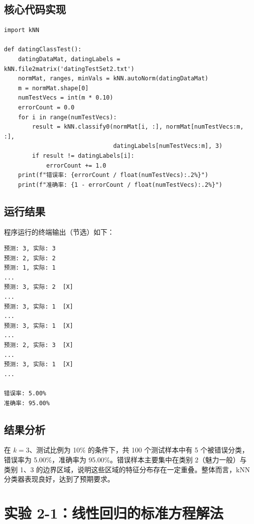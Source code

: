 \documentclass[10.5pt]{config}
\begin{document}
\subsection{核心代码实现}
\begin{listing}[H]
\begin{verbatim}
import kNN

def datingClassTest():
    datingDataMat, datingLabels = kNN.file2matrix('datingTestSet2.txt')
    normMat, ranges, minVals = kNN.autoNorm(datingDataMat)
    m = normMat.shape[0]
    numTestVecs = int(m * 0.10)
    errorCount = 0.0
    for i in range(numTestVecs):
        result = kNN.classify0(normMat[i, :], normMat[numTestVecs:m, :],
                               datingLabels[numTestVecs:m], 3)
        if result != datingLabels[i]:
            errorCount += 1.0
    print(f"错误率: {errorCount / float(numTestVecs):.2%}")
    print(f"准确率: {1 - errorCount / float(numTestVecs):.2%}")
\end{verbatim}
\caption{算法测试逻辑 (exp1\_3\_dating\_test.py)}
\end{listing}

\subsection{运行结果}
程序运行的终端输出（节选）如下：
\begin{lstlisting}[language={}, numbers=none, frame=single, backgroundcolor=\color{codebg}, basicstyle=\ttfamily\footnotesize, breaklines=true]
预测: 3, 实际: 3
预测: 2, 实际: 2
预测: 1, 实际: 1
...
预测: 3, 实际: 2  [X]
...
预测: 3, 实际: 1  [X]
...
预测: 3, 实际: 1  [X]
...
预测: 2, 实际: 3  [X]
...
预测: 3, 实际: 1  [X]
...

错误率: 5.00%
准确率: 95.00%
\end{lstlisting}

\subsection{结果分析}
在 $k=3$、测试比例为 10\% 的条件下，共 100 个测试样本中有 5 个被错误分类，错误率为 5.00\%，准确率为 95.00\%。错误样本主要集中在类别 2（魅力一般）与类别 1、3 的边界区域，说明这些区域的特征分布存在一定重叠。整体而言，kNN 分类器表现良好，达到了预期要求。

\section{实验 2-1：线性回归的标准方程解法}
\end{document}
